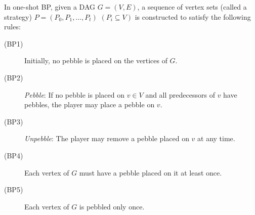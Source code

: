 \documentclass[runningheads]{llncs}
\theoremstyle{plain}
\theoremstyle{definition}
\begin{document}
In one-shot BP, given a DAG $G = (V, E)$, a sequence of vertex sets (called a strategy) $P = (P_0, P_1, \dots, P_t)$ $(P_i \subseteq V)$ is constructed to satisfy the following rules:
%
\begin{description}
    \item[(BP1)] Initially, no pebble is placed on the vertices of $G$. %
    \item[(BP2)] \emph{Pebble}: If no pebble is placed on $v \in V$ and all predecessors of $v$ have pebbles, the player may place a pebble on $v$. %
    \item[(BP3)] \emph{Unpebble}: The player may remove a pebble placed on $v$ at any time. %
    \item[(BP4)] Each vertex of $G$ must have a pebble placed on it at least once.
    \item[(BP5)] Each vertex of $G$ is pebbled only once.
\end{description}
\end{document}

